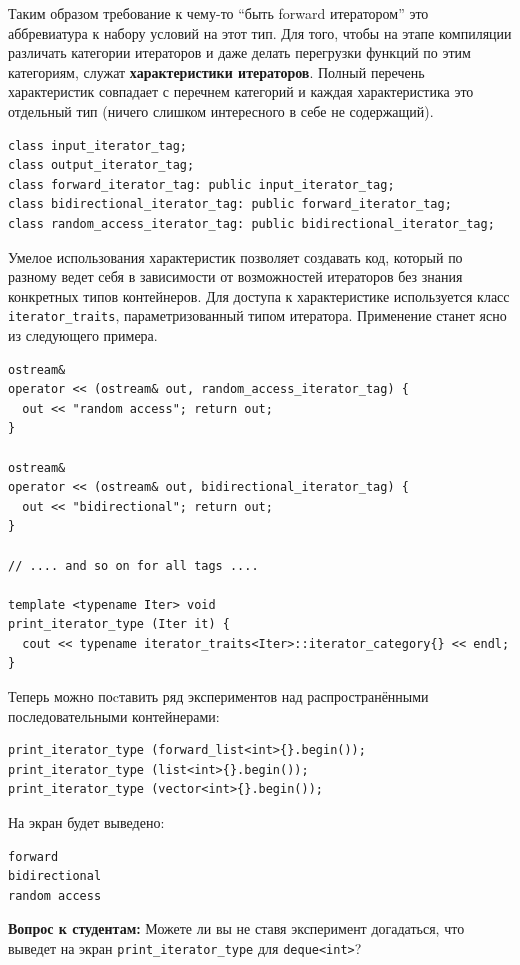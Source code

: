 \documentclass[a4paper,12pt,oneside]{article}
\begin{document}
Таким образом требование к чему-то ``быть forward итератором'' это аббревиатура к набору условий на этот тип. Для того, чтобы на этапе компиляции различать категории итераторов и даже делать перегрузки функций по этим категориям, служат \textbf{характеристики итераторов}. Полный перечень характеристик совпадает с перечнем категорий и каждая характеристика это отдельный тип (ничего слишком интересного в себе не содержащий).

\begin{lstlisting}
class input_iterator_tag;
class output_iterator_tag;
class forward_iterator_tag: public input_iterator_tag;
class bidirectional_iterator_tag: public forward_iterator_tag;
class random_access_iterator_tag: public bidirectional_iterator_tag;
\end{lstlisting}

Умелое использования характеристик позволяет создавать код, который по разному ведет себя в зависимости от возможностей итераторов без знания конкретных типов контейнеров. Для доступа к характеристике используется класс \lstinline!iterator_traits!, параметризованный типом итератора. Применение станет ясно из следующего примера.

\begin{lstlisting}
ostream& 
operator << (ostream& out, random_access_iterator_tag) { 
  out << "random access"; return out; 
}

ostream& 
operator << (ostream& out, bidirectional_iterator_tag) { 
  out << "bidirectional"; return out; 
}

// .... and so on for all tags ....

template <typename Iter> void 
print_iterator_type (Iter it) {
  cout << typename iterator_traits<Iter>::iterator_category{} << endl;
}
\end{lstlisting}

Теперь можно поcтавить ряд экспериментов над распространёнными последовательными контейнерами:

\begin{lstlisting}
print_iterator_type (forward_list<int>{}.begin()); 
print_iterator_type (list<int>{}.begin());
print_iterator_type (vector<int>{}.begin());
\end{lstlisting}

На экран будет выведено:

\begin{verbatim}
forward
bidirectional
random access
\end{verbatim}

\textbf{Вопрос к студентам:} Можете ли вы не ставя эксперимент догадаться, что выведет на экран \lstinline!print_iterator_type! для \lstinline!deque<int>!?
\end{document}
